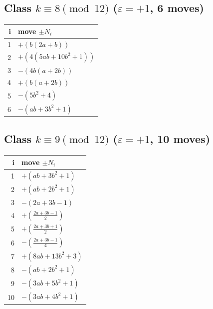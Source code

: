 \subsection*{Class $k\equiv 8\pmod{12}$ \quad ($\varepsilon=+1$, 6 moves)}
\begin{center}\renewcommand{\arraystretch}{1.35}\begin{tabular}{@{}r@{\quad}l@{}}\toprule
i & move $\pm N_i$ \\\midrule
1 & $+(b \left(2 a + b\right))$ \\
2 & $+(4 \left(5 a b + 10 b^{2} + 1\right))$ \\
3 & $-(4 b \left(a + 2 b\right))$ \\
4 & $+(b \left(a + 2 b\right))$ \\
5 & $-(5 b^{2} + 4)$ \\
6 & $-(a b + 3 b^{2} + 1)$ \\
\bottomrule\end{tabular}\end{center}

\subsection*{Class $k\equiv 9\pmod{12}$ \quad ($\varepsilon=+1$, 10 moves)}
\begin{center}\renewcommand{\arraystretch}{1.35}\begin{tabular}{@{}r@{\quad}l@{}}\toprule
i & move $\pm N_i$ \\\midrule
1 & $+(a b + 3 b^{2} + 1)$ \\
2 & $+(a b + 2 b^{2} + 1)$ \\
3 & $-(2 a + 3 b - 1)$ \\
4 & $+(\frac{2 a + 3 b - 1}{2})$ \\
5 & $+(\frac{2 a + 3 b + 1}{2})$ \\
6 & $-(\frac{2 a + 3 b - 1}{4})$ \\
7 & $+(8 a b + 13 b^{2} + 3)$ \\
8 & $-(a b + 2 b^{2} + 1)$ \\
9 & $-(3 a b + 5 b^{2} + 1)$ \\
10 & $-(3 a b + 4 b^{2} + 1)$ \\
\bottomrule\end{tabular}\end{center}

